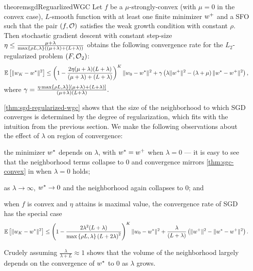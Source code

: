 \begin{restatable}{theorem}{sgdReguarlizedWGC}\label{thm:sgd-regularized-wgc}
    Let \( f \) be a \( \mu \)-strongly-convex (with \( \mu = 0 \) in the convex case), \( L \)-smooth function with at least one finite minimizer \( \wbar \) and \oracle{} a \ac{SFO} such that the pair \( \rbr{f, \oracle{}} \) satisfies the weak growth condition with constant \( \rho \).
    Then stochastic gradient descent with constant step-size \( \eta \leq \frac{\mu + \lambda}{\max\cbr{\rho L, \lambda}\rbr{(\mu + \lambda) + (L + \lambda)}} \) obtains the following convergence rate for the \( L_2 \)-regularized problem \( \rbr{F, \oracle{}_2} \):
    \[  \E\sbr{\norm{\w_K - \wopt}^2} \leq \rbr{1 - \frac{2 \eta (\mu + \lambda)(L + \lambda)}{(\mu + \lambda) + (L + \lambda)}}^K \norm{\w_0 - \wopt}^2 + \gamma\rbr{\lambda \norm{\wbar}^2 - \rbr{\lambda + \mu}\norm{\wopt - \wbar}^2}, \]
    where \( \gamma = \frac{\eta \max\cbr{\rho L, \lambda} \sbr{(\mu + \lambda) + (L + \lambda)}}{(\mu + \lambda)(L + \lambda)}. \)  
\end{restatable}

\autoref{thm:sgd-regularized-wgc} shows that the size of the neighborhood to which \ac{SGD} converges is determined by the degree of regularization, which fits with the intuition from the previous section.
We make the following observations about the effect of \( \lambda \) on region of convergence:
\begin{inparaenum}[(i)]
\item the minimizer \( \wopt \) depends on \( \lambda \), with \( \wopt = \wbar \) when \( \lambda = 0 \) --- it is easy to see that the neighborhood terms collapse to \( 0 \) and convergence mirrors \autoref{thm:sgc-convex} in when \( \lambda = 0 \) holds;
\item as \( \lambda \rightarrow \infty \), \( \wopt \rightarrow 0 \) and the neighborhood again collapses to \( 0 \); and 
\item when \( f \) is convex and \( \eta \) attains is maximal value, the convergence rate of \ac{SGD} has the special case 
\[  \E\sbr{\norm{\w_K - \wopt}^2} \leq \rbr{1 - \frac{2 \lambda^2(L + \lambda)}{\max\cbr{\rho L, \lambda} \rbr{L + 2\lambda}^2}}^K \norm{\w_0 - \wopt}^2 + \frac{\lambda}{\rbr{L + \lambda}}\rbr{\norm{\wbar}^2 - \norm{\wopt - \wbar}^2}. \]
\end{inparaenum}
Crudely assuming \( \frac{\lambda}{\lambda + L} \approx 1 \) shows that the volume of the neighborhood largely depends on the convergence of \( \wopt \) to \( 0 \) as \( \lambda \) grows.

